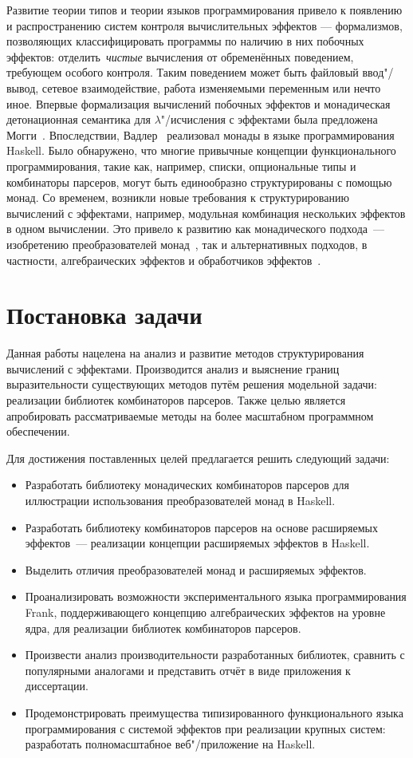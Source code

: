 \documentclass [fontsize=14pt, paper=a4, pagesize, DIV=calc]%
{article}
\begin{document}
Развитие теории типов и теории языков программирования привело к появлению и
распространению систем контроля вычислительных эффектов --- формализмов, позволяющих
классифицировать программы по наличию в них побочных эффектов: отделить~\emph{чистые}
вычисления от обременённых поведением, требующем особого контроля. Таким поведением
может быть файловый ввод"/вывод, сетевое взаимодействие, работа изменяемыми переменным
или нечто иное. Впервые формализация вычислений побочных эффектов и монадическая
детонационная семантика для $\lambda$"/исчисления с эффектами была предложена
Могги~\cite{Moggi:1991:NCM:116981.116984}. Впоследствии,
Вадлер~\cite{Wadler:1992:EFP:143165.143169} реализовал монады в языке программирования
Haskell. Было обнаружено, что многие привычные концепции функционального программирования,
такие как, например, списки, опциональные типы и комбинаторы парсеров, могут быть
единообразно структурированы с помощью монад. Со временем, возникли новые требования
к структурированию вычислений с эффектами, например, модульная комбинация нескольких
эффектов в одном вычислении. Это привело к развитию как монадического подхода~---
изобретению преобразователей монад~\cite{Liang:1995:MTM:199448.199528}, так и
альтернативных подходов, в частности, алгебраических эффектов и обработчиков
эффектов~\cite{DBLP:journals/jlp/BauerP15}.

\section{Постановка задачи}

Данная работы нацелена на анализ и развитие методов структурирования вычислений
с эффектами. Производится анализ и выяснение границ выразительности существующих
методов путём решения модельной задачи: реализации библиотек комбинаторов парсеров.
Также целью является апробировать рассматриваемые методы на более масштабном программном обеспечении.

Для достижения поставленных целей предлагается решить следующий задачи:

\begin{itemize}
\item Разработать библиотеку монадических комбинаторов парсеров для
иллюстрации использования преобразователей монад в Haskell.
\item Разработать библиотеку комбинаторов парсеров на основе расширяемых эффектов~---
реализации концепции расширяемых эффектов в Haskell.
\item Выделить отличия преобразователей монад и расширяемых эффектов.
\item Проанализировать возможности экспериментального языка программирования Frank,
поддерживающего концепцию алгебраических эффектов на уровне ядра, для реализации
библиотек комбинаторов парсеров.
\item Произвести анализ производительности разработанных библиотек, сравнить с
популярными аналогами и представить отчёт в виде приложения к диссертации.
\item Продемонстрировать преимущества типизированного функционального языка программирования
с системой эффектов при реализации крупных систем: разработать полномасштабное
веб"/приложение на Haskell.
\end{itemize}
\end{document}
